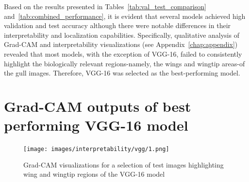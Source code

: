 \documentclass[a4paper,12pt]{report}
\begin{document}
\begin{table}[H]
    \centering
    \caption{Comprehensive Model Performance Metrics on Test Dataset}
    \label{tab:combined_performance}
\end{table}

Based on the results presented in Tables~\ref{tab:val_test_comparison} and~\ref{tab:combined_performance}, it is evident that several models achieved high validation and test accuracy although there were notable differences in their interpretability and localization capabilities. Specifically, qualitative analysis of Grad-CAM and interpretability visualizations (see Appendix~\ref{chap:appendix}) revealed that most models, with the exception of VGG-16, failed to consistently highlight the biologically relevant regions-namely, the wings and wingtip areas-of the gull images. Therefore, VGG-16 was selected as the best-performing model.

\section{Grad-CAM outputs of best performing VGG-16 model}

\begin{figure}[H]
    \centering
    \texttt{[image: images/interpretability/vgg/1.png]}
    \caption{Grad-CAM visualizations for a selection of test images highlighting wing and wingtip regions of the VGG-16 model}
    \label{fig:vgg16_gradcam}
\end{figure}
\end{document}
